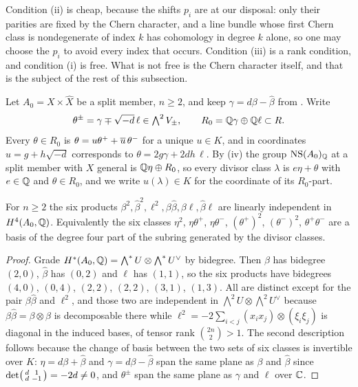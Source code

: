 Condition (ii) is cheap, because the shifts $p_{i}$ are at our disposal: only
their parities are fixed by the Chern character, and a line bundle whose first
Chern class is nondegenerate of index $k$ has cohomology in degree $k$ alone,
so one may choose the $p_{i}$ to avoid every index that occurs. Condition
(iii) is a rank condition, and condition (i) is free. What is not free is the
Chern character itself, and that is the subject of the rest of this
subsection.

\begin{notation}\label{not:splitcoords}
Let $A_{0}=X\times\widehat{X}$ be a split member, $n\ge2$, and keep
$\gamma=d\beta-\widehat{\beta}$ from . Write
\[
  \theta^{\pm}=\gamma\mp\sqrt{-d}\,\ell\in\textstyle\bigwedge^{2}V_{\pm},
  \qquad
  R_{0}=\mathbb{Q}\gamma\oplus\mathbb{Q}\ell\subset R .
\]
Every $\theta\in R_{0}$ is $\theta=u\theta^{+}+\overline{u}\,\theta^{-}$ for a
unique $u\in K$, and in coordinates $u=g+h\sqrt{-d}$ corresponds to
$\theta=2g\gamma+2dh\,\ell$. By (iv) the group
$\mathrm{NS}(A_{0})_{\mathbb{Q}}$ at a split member with $X$ general is
$\mathbb{Q}\eta\oplus R_{0}$, so every divisor class $\lambda$ is $e\eta+\theta$ with
$e\in\mathbb{Q}$ and $\theta\in R_{0}$, and we write $u(\lambda)\in K$ for the
coordinate of its $R_{0}$-part.
\end{notation}

\begin{lemma}\label{lem:sixmonomials}
For $n\ge2$ the six products
$\beta^{2},\widehat\beta^{2},\ell^{2},\beta\widehat\beta,\beta\ell,
\widehat\beta\ell$
are linearly independent in $H^{4}(A_{0},\mathbb{Q})$. Equivalently the six classes
$\eta^{2}$, $\eta\theta^{+}$, $\eta\theta^{-}$, $(\theta^{+})^{2}$,
$(\theta^{-})^{2}$, $\theta^{+}\theta^{-}$ are a basis of the degree four part
of the subring generated by the divisor classes.
\end{lemma}

\begin{proof}
Grade $H^{*}(A_{0},\mathbb{Q})=\bigwedge^{*}U\otimes\bigwedge^{*}U^{\vee}$ by
bidegree. Then $\beta$ has bidegree $(2,0)$, $\widehat\beta$ has $(0,2)$ and
$\ell$ has $(1,1)$, so the six products have bidegrees $(4,0)$, $(0,4)$,
$(2,2)$, $(2,2)$, $(3,1)$, $(1,3)$. All are distinct except for the pair
$\beta\widehat\beta$ and $\ell^{2}$, and those two are independent in
$\bigwedge^{2}U\otimes\bigwedge^{2}U^{\vee}$ because
$\beta\widehat\beta=\beta\otimes\widehat\beta$ is decomposable there while
$\ell^{2}=-2\sum_{i<j}(x_{i}x_{j})\otimes(\xi_{i}\xi_{j})$ is diagonal in
the induced bases, of tensor rank $\binom{2n}{2}>1$. The second
description follows because the change of basis between the two sets of six
classes is invertible over $K$: $\eta=d\beta+\widehat\beta$ and
$\gamma=d\beta-\widehat\beta$ span the same plane as
$\beta$ and $\widehat\beta$ since $\det\begin{psmallmatrix}d&1\\
d&-1\end{psmallmatrix}=-2d\ne0$, and $\theta^{\pm}$ span the same plane
as $\gamma$ and $\ell$ over $\mathbb{C}$.
\end{proof}

